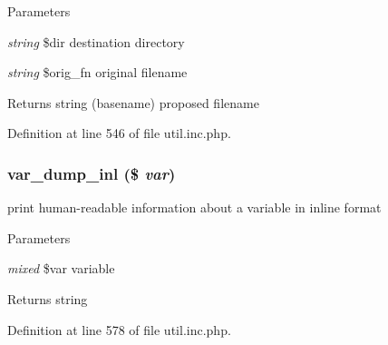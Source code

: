 \begin{DoxyParams}{Parameters}
\item[{\em string}]\$dir destination directory \item[{\em string}]\$orig\_\-fn original filename \end{DoxyParams}
\begin{DoxyReturn}{Returns}
string (basename) proposed filename 
\end{DoxyReturn}


Definition at line 546 of file util.inc.php.

\hypertarget{util_8inc_8php_aa5cc9d5f8a0b5bb76dfe3d15796e5940}{
\subsubsection[{var\_\-dump\_\-inl}]{\setlength{\rightskip}{0pt plus 5cm}var\_\-dump\_\-inl (\$ {\em var})}}
\label{util_8inc_8php_aa5cc9d5f8a0b5bb76dfe3d15796e5940}
print human-\/readable information about a variable in inline format


\begin{DoxyParams}{Parameters}
\item[{\em mixed}]\$var variable \end{DoxyParams}
\begin{DoxyReturn}{Returns}
string 
\end{DoxyReturn}


Definition at line 578 of file util.inc.php.

